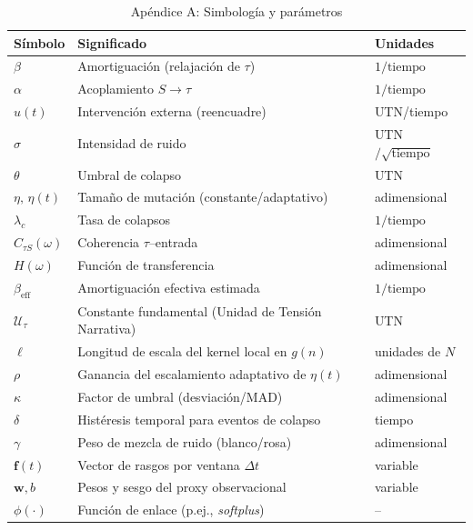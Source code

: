 \documentclass[10pt,a4paper,twocolumn]{article}
\theoremstyle{definition}
\theoremstyle{plain}
\begin{document}
\begin{table}[!t] %
\caption*{Apéndice A: Simbología y parámetros}
\renewcommand{\arraystretch}{1.05}
\centering
\begin{tabular}{@{}p{2.4cm}p{11.8cm}p{2.2cm}@{}} %
\toprule
\textbf{Símbolo} & \textbf{Significado} & \textbf{Unidades}\\
\midrule
$\beta$ & Amortiguación (relajación de $\tau$) & $1/\text{tiempo}$\\
$\alpha$ & Acoplamiento $S\to\tau$ & $1/\text{tiempo}$\\
$u(t)$ & Intervención externa (reencuadre) & UTN/tiempo\\
$\sigma$ & Intensidad de ruido & UTN$/\sqrt{\text{tiempo}}$\\
$\theta$ & Umbral de colapso & UTN\\
$\eta,\,\eta(t)$ & Tamaño de mutación (constante/adaptativo) & adimensional\\
$\lambda_c$ & Tasa de colapsos & $1/\text{tiempo}$\\
$C_{\tau S}(\omega)$ & Coherencia \(\tau\)–entrada & adimensional\\
$H(\omega)$ & Función de transferencia & adimensional\\
$\beta_{\mathrm{eff}}$ & Amortiguación efectiva estimada & $1/\text{tiempo}$\\
$\mathcal{U}_\tau$ & Constante fundamental (Unidad de Tensión Narrativa) & UTN\\
$\ell$  & Longitud de escala del kernel local en $g(n)$ & unidades de $N$\\
$\rho$  & Ganancia del escalamiento adaptativo de $\eta(t)$ & adimensional\\
$\kappa$ & Factor de umbral (desviación/MAD) & adimensional\\
$\delta$ & Histéresis temporal para eventos de colapso & tiempo\\
$\gamma$ & Peso de mezcla de ruido (blanco/rosa) & adimensional\\
$\mathbf{f}(t)$ & Vector de rasgos por ventana $\Delta t$ & variable\\
$\mathbf{w},b$ & Pesos y sesgo del proxy observacional & variable\\
$\phi(\cdot)$ & Función de enlace (p.ej., \textit{softplus}) & -- \\
\bottomrule
\end{tabular}
\end{table}
\end{document}
